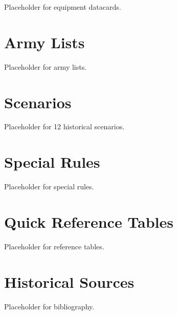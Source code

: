 \documentclass[11pt,letterpaper,twoside]{book}
\begin{document}
Placeholder for equipment datacards.

\chapter{Army Lists}

Placeholder for army lists.

\chapter{Scenarios}

Placeholder for 12 historical scenarios.

\chapter{Special Rules}

Placeholder for special rules.

\appendix

\chapter{Quick Reference Tables}

Placeholder for reference tables.

\chapter{Historical Sources}

Placeholder for bibliography.
\end{document}
